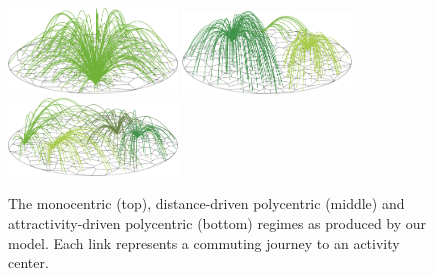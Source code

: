 \begin{figure}
\includegraphics[width=0.4\textwidth]{gfx/chapter-monocentric/1.pdf}
\includegraphics[width=0.4\textwidth]{gfx/chapter-monocentric/2.pdf}
\includegraphics[width=0.4\textwidth]{gfx/chapter-monocentric/3.pdf}
\caption{The monocentric (top), distance-driven polycentric (middle)
  and attractivity-driven polycentric (bottom) regimes as produced by
  our model. Each link represents a commuting journey to an activity center. \label{fig:model_results}}
\end{figure}


